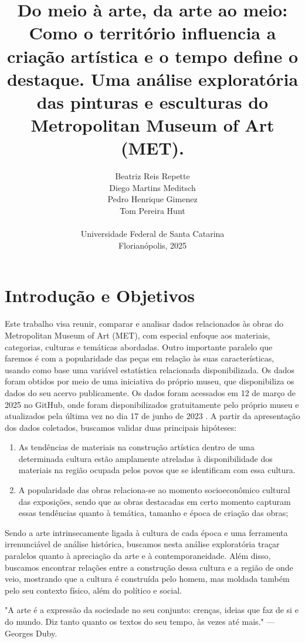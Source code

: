 \documentclass[11pt,a4paper]{article}
\title{Do meio à arte, da arte ao meio: \\Como o território influencia a criação artística e o tempo define o destaque. Uma análise exploratória das pinturas e esculturas do Metropolitan Museum of Art (MET).}
\author{
  Beatriz Reis Repette \\
  Diego Martins Meditsch \\
  Pedro Henrique Gimenez \\
  Tom Pereira Hunt \\
  \\
  Universidade Federal de Santa Catarina \\
  Florianópolis, 2025
}
\date{}
\begin{document}
\maketitle

\section{Introdução e Objetivos}
Este trabalho visa reunir, comparar e analisar dados relacionados às obras do Metropolitan Museum of Art (MET), com especial enfoque aos materiais, categorias, culturas e temáticas abordadas. Outro importante paralelo que faremos é com a popularidade das peças em relação às suas características, usando como base uma variável estatística relacionada disponibilizada.
Os dados foram obtidos por meio de uma iniciativa do próprio museu, que disponibiliza os dados do seu acervo publicamente. Os dados foram acessados em 12 de março de 2025 no GitHub, onde foram disponibilizados gratuitamente pelo próprio museu e atualizados pela última vez no dia 17 de junho de 2023 \cite{metOpenAccess}.
A partir da apresentação dos dados coletados, buscamos validar duas principais hipóteses:
\begin{enumerate}
    \item As tendências de materiais na construção artística dentro de uma determinada cultura estão amplamente atreladas à disponibilidade dos materiais na região ocupada pelos povos que se identificam com essa cultura.
    \item A popularidade das obras relaciona-se ao momento socioeconômico cultural das exposições, sendo que as obras destacadas em certo momento capturam essas tendências quanto à temática, tamanho e época de criação das obras;
\end{enumerate}
	Sendo a arte intrinsecamente ligada à cultura de cada época e uma ferramenta irrenunciável de análise histórica, buscamos nesta análise exploratória traçar paralelos quanto à apreciação da arte e à contemporaneidade. Além disso, buscamos encontrar relações entre a construção dessa cultura e a região de onde veio, mostrando que a cultura é construída pelo homem, mas moldada também pelo seu contexto físico, além do político e social.

"A arte é a expressão da sociedade no seu conjunto: crenças, ideias que faz de si e do mundo. Diz tanto quanto os textos do seu tempo, às vezes até mais." --- Georges Duby.

\end{document}
